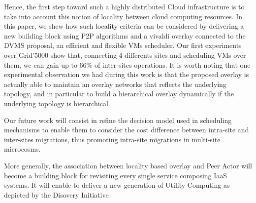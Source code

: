 Hence, the first step toward such a highly distributed Cloud infrastructure is
to take into account this notion of locality between cloud computing resources.
In this paper, we shew how such locality criteria can be considered by
delivering a new building block using  P2P algorithms and a vivaldi overlay
connected to the DVMS proposal, an efficient and flexible VMs scheduler.  Our
first experiments over Grid'5000 show that, connecting 4 differents sites and
scheduling VMs over them, we can gain up to 66\% of inter-sites operations. It
is worth noting that one experimental observation we had during this work is
that the proposed overlay is actually able to maintain an overlay networks that
reflects the underlying topology, and in particular to build a hierarchical
overlay dynamically if the underlying topology is hierarchical.

Our future work will consist in refine the decision model used in scheduling mechanisms to enable them to consider the cost difference between intra-site and inter-sites migrations, thus promoting intra-site migrations in multi-site microcosms.

More generally, the association between locality based overlay and Peer Actor will become a building block for revisiting every single service composing IaaS systems. It will enable to deliver a new generation of Utility Computing as depicted by the
Disovery Initiative
